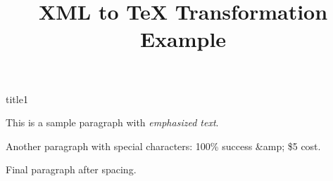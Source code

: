 \documentclass[12pt,a4paper]{article}
\newcommand{\paraid}[1]{\par\noindent\hypertarget{#1}{\ignorespaces}}
\begin{document}
\title{XML to TeX Transformation Example}{title1}


\paraid{p1}This is a sample paragraph with \textit{emphasized text}.
\par
\paraid{p2}Another paragraph with special characters: 100\% success \&amp; \$5 cost.
\par\vspace{10pt}
\paraid{p3}Final paragraph after spacing.
\par
\end{document}
